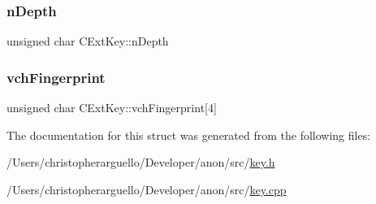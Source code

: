 \mbox{\label{struct_c_ext_key_ab197a253f41646975405b4ead8027b55}} 
\subsubsection{\texorpdfstring{n\+Depth}{nDepth}}
{\footnotesize\ttfamily unsigned char C\+Ext\+Key\+::n\+Depth}

\mbox{\label{struct_c_ext_key_a22efb3f5dfb26cd8d88d2ab5db885978}} 
\subsubsection{\texorpdfstring{vch\+Fingerprint}{vchFingerprint}}
{\footnotesize\ttfamily unsigned char C\+Ext\+Key\+::vch\+Fingerprint\mbox{[}4\mbox{]}}



The documentation for this struct was generated from the following files\+:\begin{DoxyCompactItemize}
\item 
/\+Users/christopherarguello/\+Developer/anon/src/\mbox{\hyperlink{key_8h}{key.\+h}}\item 
/\+Users/christopherarguello/\+Developer/anon/src/\mbox{\hyperlink{key_8cpp}{key.\+cpp}}\end{DoxyCompactItemize}
